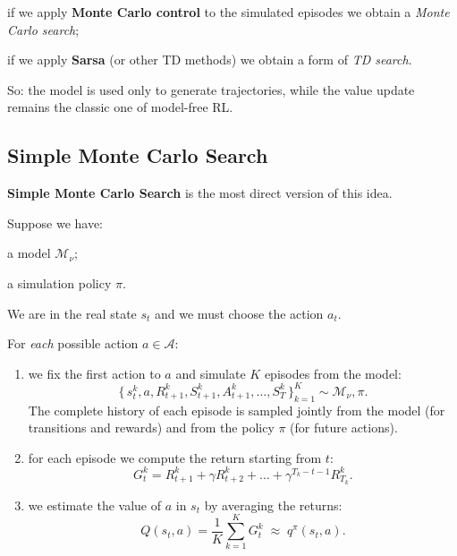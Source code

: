 \begin{compactitemize}
    \item if we apply \textbf{Monte Carlo control} to the simulated episodes we obtain
          a \emph{Monte Carlo search};
    \item if we apply \textbf{Sarsa} (or other TD methods) we obtain a form of
          \emph{TD search}.
\end{compactitemize}

So: the model is used only to generate trajectories, while the value update
remains the classic one of model-free RL.

\subsection{Simple Monte Carlo Search}

\textbf{Simple Monte Carlo Search} is the most direct version of this idea.

Suppose we have:
\begin{compactitemize}
    \item a model $\mathcal{M}_\nu$;
    \item a simulation policy $\pi$.
\end{compactitemize}

We are in the real state $s_t$ and we must choose the action $a_t$.

For \emph{each} possible action $a \in \mathcal{A}$:

\begin{enumerate}
    \item we fix the first action to $a$ and simulate $K$ episodes from the model:
    \[
    \bigl\{\, s_t^k, a, R_{t+1}^k, S_{t+1}^k, A_{t+1}^k, \dots, S_T^k \,\bigr\}_{k=1}^K
    \sim \mathcal{M}_\nu, \pi.
    \]
    The complete history of each episode is sampled jointly from the model
    (for transitions and rewards) and from the policy $\pi$ (for future actions).

    \item for each episode we compute the return starting from $t$:
    \[
    G_t^k = R_{t+1}^k + \gamma R_{t+2}^k + \dots + \gamma^{T_k - t - 1} R_{T_k}^k.
    \]

    \item we estimate the value of $a$ in $s_t$ by averaging the returns:
    \[
    Q(s_t,a)
    =
    \frac{1}{K} \sum_{k=1}^{K} G_t^k
    \;\approx\;
    q^\pi(s_t,a).
    \]
\end{enumerate}

